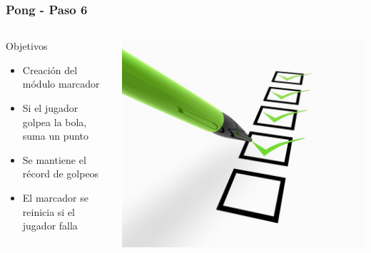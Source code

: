 \begin{frame}
	\frametitle{Pong - Paso 6}
    \begin{columns}[c]
	\column{175pt}
	\begin{block}{Objetivos}
		\begin{itemize}
			\item Creación del módulo marcador
			\item Si el jugador golpea la bola, suma un punto
			\item Se mantiene el récord de golpeos
			\item El marcador se reinicia si el jugador falla
		\end{itemize}            
	\end{block}
	
    \column{125pt}
	\begin{center}
		\includegraphics[scale=0.6]{img/checklist.jpg}
	\end{center}	
	
    \end{columns}
\end{frame}

